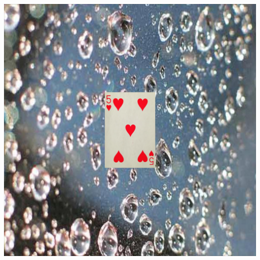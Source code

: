 \documentclass[a4paper]{article}
\begin{document}
\begin{minipage}{\columnwidth}
{\includegraphics[scale=0.04]{images/5h_1}}  \qquad 
{}
\end{minipage}
\end{document}
